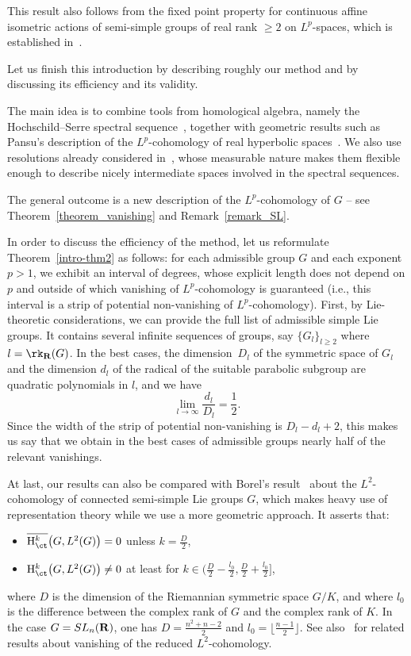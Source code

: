 This result also follows from the fixed point property for continuous affine isometric actions of semi-simple groups of real rank $\geqslant 2$ on $L^p$-spaces, which is established in~\cite{BFGM}.


Let us finish this introduction by describing roughly our method and by discussing its efficiency and its validity.

The main idea is to combine tools from homological algebra, namely the Hochschild--Serre spectral sequence~\cite[Chapter~IX, \textsection~4]{BW}, together with geometric results such as Pansu's description of the $L^p$-cohomology of real hyperbolic spaces~\cite{P1,Pa99}. We also use resolutions already considered in~\cite{Bl}, whose measurable nature makes them flexible enough to describe nicely intermediate spaces involved in the spectral sequences.

The general outcome is a new description of the $L^p$-cohomology of $G$ -- see Theorem~\ref{theorem_vanishing} and Remark~\ref{remark_SL}.

In order to discuss the efficiency of the method, let us reformulate Theorem~\ref{intro-thm2} as follows: for each admissible group $G$ and each exponent $p>1$, we exhibit an interval of degrees, whose explicit length does not depend on $p$ and outside of which vanishing of $L^p$-cohomology is guaranteed (i.e., this interval is a strip of potential non-vanishing of $L^p$-cohomology). First, by Lie-theoretic considerations, we can provide the full list of admissible simple Lie groups. It contains several infinite sequences of groups, say $\{ G_l \}_{l \geqslant 2}$ where $l=\rk_{\bf R} (G)$. In the best cases, the dimension~$D_l$ of the symmetric space of $G_l$ and the dimension $d_l$ of the radical of the suitable parabolic subgroup are quadratic polynomials in $l$, and we have
\[ 
\lim_{l \to \infty} \frac{d_l}{D_l} = \frac{1}{2}.
\]
Since the width of the strip of potential non-vanishing is $D_l-d_l+2$, this makes us say that we obtain in the best cases of admissible groups nearly half of the relevant vanishings.

At last, our results can also be compared with Borel's result~\cite{Borel} about the $L^2$-cohomology of connected semi-simple Lie groups $G$, which makes heavy use of representation theory while we use a more geometric approach. It asserts that:
\begin{itemize}
\item $\overline{{\rm H}^k_{\ct}} \bigl(G, L^2(G) \bigr) = 0$ unless $k = \frac{D}{2}$,
\item ${\rm H}^k_{\ct} \bigl(G, L^2(G) \bigr) \neq 0$ at least for $k \in \bigl(\frac{D}{2} - \frac{l_0}{2}, \frac{D}{2} +\frac{l_0}{2}\bigr]$,
\end{itemize}
where $D$ is the dimension of the Riemannian symmetric space $G/K$, and where $l_0$ is the difference between the complex rank of $G$ and the complex rank of $K$. In the case $G =  SL_n({\bf R})$, one has $D = \frac{n^2 + n -2}{2}$ and $l_0 = \lfloor \frac{n-1}{2} \rfloor$. See also~\cite{BFS} for related results about vanishing of the reduced $L^2$-cohomology.


